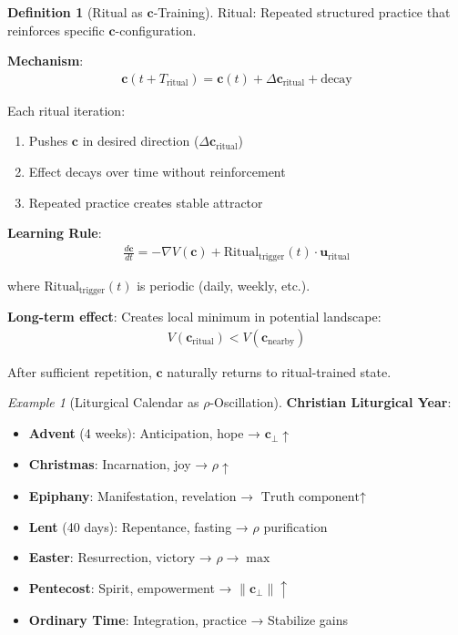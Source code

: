 \documentclass[11pt,a4paper]{article}
\theoremstyle{definition}
\newtheorem{definition}{Definition}[section]
\theoremstyle{remark}
\newtheorem{example}{Example}[section]
\newcommand{\cc}{\mathbf{c}}
\begin{document}
\begin{small}
\begin{enumerate}
\begin{protocol}
\begin{definition}[Ritual as \(\cc\)-Training]
Ritual: Repeated structured practice that reinforces specific \(\cc\)-configuration.

\textbf{Mechanism}:
\begin{align}
\cc(t + T_{\text{ritual}}) = \cc(t) + \Delta\cc_{\text{ritual}} + \text{decay}
\end{align}

Each ritual iteration:
\begin{enumerate}
    \item Pushes \(\cc\) in desired direction (\(\Delta\cc_{\text{ritual}}\))
    \item Effect decays over time without reinforcement
    \item Repeated practice creates stable attractor
\end{enumerate}

\textbf{Learning Rule}:
\begin{align}
\frac{d\cc}{dt} = -\nabla V(\cc) + \text{Ritual}_{\text{trigger}}(t) \cdot \mathbf{u}_{\text{ritual}}
\end{align}

where \(\text{Ritual}_{\text{trigger}}(t)\) is periodic (daily, weekly, etc.).

\textbf{Long-term effect}: Creates local minimum in potential landscape:
\begin{align}
V(\cc_{\text{ritual}}) < V(\cc_{\text{nearby}})
\end{align}

After sufficient repetition, \(\cc\) naturally returns to ritual-trained state.
\end{definition}

\begin{example}[Liturgical Calendar as \(\rho\)-Oscillation]
\textbf{Christian Liturgical Year}:
\begin{itemize}
    \item \textbf{Advent} (4 weeks): Anticipation, hope → \(\cc_\perp \uparrow\)
    \item \textbf{Christmas}: Incarnation, joy → \(\rho \uparrow\)
    \item \textbf{Epiphany}: Manifestation, revelation → \(\text{Truth component} \uparrow\)
    \item \textbf{Lent} (40 days): Repentance, fasting → \(\rho\) purification
    \item \textbf{Easter}: Resurrection, victory → \(\rho \to \max\)
    \item \textbf{Pentecost}: Spirit, empowerment → \(\|\cc_\perp\| \uparrow\)
    \item \textbf{Ordinary Time}: Integration, practice → Stabilize gains
\end{itemize}


\end{example}
\end{protocol}
\end{enumerate}
\end{small}
\end{document}
